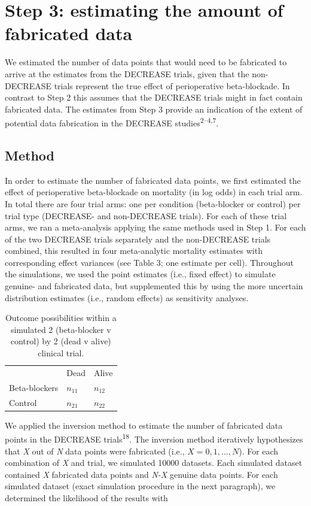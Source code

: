 \documentclass[]{article}
\begin{document}
\section{Step 3: estimating the amount of fabricated
data}\label{step-3-estimating-the-amount-of-fabricated-data}

We estimated the number of data points that would need to be fabricated
to arrive at the estimates from the DECREASE trials, given that the
non-DECREASE trials represent the true effect of perioperative
beta-blockade. In contrast to Step 2 this assumes that the DECREASE
trials might in fact contain fabricated data. The estimates from Step 3
provide an indication of the extent of potential data fabrication in the
DECREASE studies\textsuperscript{2--4,7}.

\subsection{Method}\label{method-1}

In order to estimate the number of fabricated data points, we first
estimated the effect of perioperative beta-blockade on mortality (in log
odds) in each trial arm. In total there are four trial arms: one per
condition (beta-blocker or control) per trial type (DECREASE- and
non-DECREASE trials). For each of these trial arms, we ran a
meta-analysis applying the same methods used in Step 1. For each of the
two DECREASE trials separately and the non-DECREASE trials combined,
this resulted in four meta-analytic mortality estimates with
corresponding effect variances (see Table 3; one estimate per cell).
Throughout the simulations, we used the point estimates (i.e., fixed
effect) to simulate genuine- and fabricated data, but supplemented this
by using the more uncertain distribution estimates (i.e., random
effects) as sensitivity analyses.

\begin{longtable}[]{@{}lll@{}}
\caption{Outcome possibilities within a simulated 2 (beta-blocker v
control) by 2 (dead v alive) clinical trial.}\tabularnewline
\toprule
& Dead & Alive\tabularnewline
Beta-blockers & \(n_{11}\) & \(n_{12}\)\tabularnewline
Control & \(n_{21}\) & \(n_{22}\)\tabularnewline
\bottomrule
\end{longtable}

We applied the inversion method to estimate the number of fabricated
data points in the DECREASE trials\textsuperscript{18}. The inversion
method iteratively hypothesizes that \emph{X} out of \emph{N} data
points were fabricated (i.e., \(X={0, 1, ..., N}\)). For each
combination of \emph{X} and trial, we simulated 10000 datasets. Each
simulated dataset contained \emph{X} fabricated data points and
\emph{N-X} genuine data points. For each simulated dataset (exact
simulation procedure in the next paragraph), we determined the
likelihood of the results with
\end{document}
